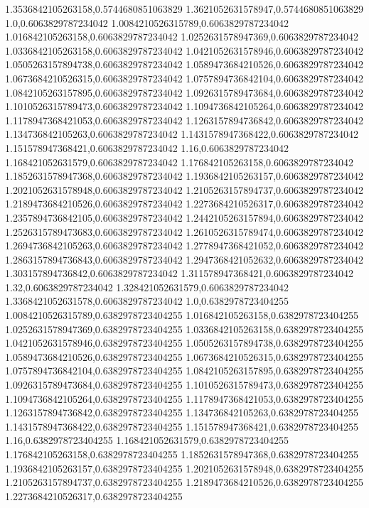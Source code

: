 1.3536842105263158,0.5744680851063829
1.3621052631578947,0.5744680851063829
1.0,0.6063829787234042
1.0084210526315789,0.6063829787234042
1.016842105263158,0.6063829787234042
1.0252631578947369,0.6063829787234042
1.0336842105263158,0.6063829787234042
1.0421052631578946,0.6063829787234042
1.0505263157894738,0.6063829787234042
1.0589473684210526,0.6063829787234042
1.0673684210526315,0.6063829787234042
1.0757894736842104,0.6063829787234042
1.0842105263157895,0.6063829787234042
1.0926315789473684,0.6063829787234042
1.1010526315789473,0.6063829787234042
1.1094736842105264,0.6063829787234042
1.1178947368421053,0.6063829787234042
1.1263157894736842,0.6063829787234042
1.134736842105263,0.6063829787234042
1.1431578947368422,0.6063829787234042
1.151578947368421,0.6063829787234042
1.16,0.6063829787234042
1.168421052631579,0.6063829787234042
1.176842105263158,0.6063829787234042
1.1852631578947368,0.6063829787234042
1.1936842105263157,0.6063829787234042
1.2021052631578948,0.6063829787234042
1.2105263157894737,0.6063829787234042
1.2189473684210526,0.6063829787234042
1.2273684210526317,0.6063829787234042
1.2357894736842105,0.6063829787234042
1.2442105263157894,0.6063829787234042
1.2526315789473683,0.6063829787234042
1.2610526315789474,0.6063829787234042
1.2694736842105263,0.6063829787234042
1.2778947368421052,0.6063829787234042
1.2863157894736843,0.6063829787234042
1.2947368421052632,0.6063829787234042
1.303157894736842,0.6063829787234042
1.311578947368421,0.6063829787234042
1.32,0.6063829787234042
1.328421052631579,0.6063829787234042
1.3368421052631578,0.6063829787234042
1.0,0.6382978723404255
1.0084210526315789,0.6382978723404255
1.016842105263158,0.6382978723404255
1.0252631578947369,0.6382978723404255
1.0336842105263158,0.6382978723404255
1.0421052631578946,0.6382978723404255
1.0505263157894738,0.6382978723404255
1.0589473684210526,0.6382978723404255
1.0673684210526315,0.6382978723404255
1.0757894736842104,0.6382978723404255
1.0842105263157895,0.6382978723404255
1.0926315789473684,0.6382978723404255
1.1010526315789473,0.6382978723404255
1.1094736842105264,0.6382978723404255
1.1178947368421053,0.6382978723404255
1.1263157894736842,0.6382978723404255
1.134736842105263,0.6382978723404255
1.1431578947368422,0.6382978723404255
1.151578947368421,0.6382978723404255
1.16,0.6382978723404255
1.168421052631579,0.6382978723404255
1.176842105263158,0.6382978723404255
1.1852631578947368,0.6382978723404255
1.1936842105263157,0.6382978723404255
1.2021052631578948,0.6382978723404255
1.2105263157894737,0.6382978723404255
1.2189473684210526,0.6382978723404255
1.2273684210526317,0.6382978723404255

